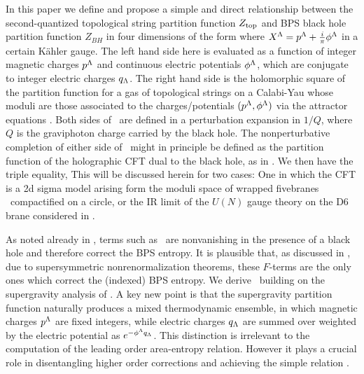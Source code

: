 In this paper we define and propose a simple and direct
relationship between the second-quantized topological string
partition function $Z_{\rm top}$ and BPS black hole partition function
$Z_{BH}$ in  four dimensions of the form
%
    \eqn{}
%
where $X^{\Lambda}=p^{\Lambda}+{i\over \pi}\phi^{\Lambda}$ in a certain K\"ahler gauge.
The left hand side here is evaluated as a function of integer
magnetic charges $p^{\Lambda}$ and continuous electric potentials
$\phi^{\Lambda}$, which are conjugate to integer electric charges $q_{\Lambda}$.
The right hand side is the holomorphic square of the partition
function for a gas of topological strings on a Calabi-Yau whose
moduli are those associated to the charges/potentials
$(p^{\Lambda},\phi^{\Lambda})$ via the attractor equations
 . Both sides of \tui\ are
defined in a perturbation expansion in $1/Q$, where $Q$ is the
graviphoton charge carried by the black hole. The nonperturbative completion of either side of
\tui\ might in principle be defined as the partition function of
the holographic CFT dual to the black hole, as in \ascv. We then
have the triple equality, \eqn{} This will be discussed herein for two cases:  One in
which the CFT is a 2d sigma model arising form the moduli space of
wrapped fivebranes \msw\ compactified on a circle, or the IR limit
of the $U(N)$ gauge theory on the D6 brane considered in \inov
.



As noted already in , terms such as \tyu\ are
nonvanishing in the presence of a black hole and therefore correct
the BPS entropy. It is plausible that, as discussed in
, due to supersymmetric nonrenormalization
theorems, these $F$-terms are the only ones which correct the
(indexed) BPS entropy. We derive \tui\ building on the
supergravity analysis of . A key new point is
that the supergravity partition function naturally produces a
mixed thermodynamic ensemble, in which magnetic charges $p^{\Lambda}$ are
fixed integers, while electric charges $q_{\Lambda}$ are summed over
weighted by the electric potential as $e^{-\phi^{\Lambda} q_{\Lambda}}$. This
distinction is irrelevant to the computation of the leading order
area-entropy relation. However it plays a crucial role in
disentangling higher order corrections and achieving the simple
relation \tui.



